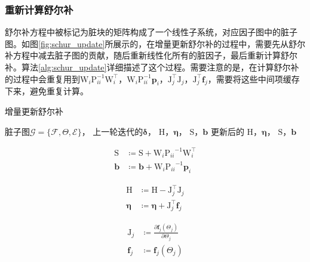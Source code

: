 \subsubsection{重新计算舒尔补}

舒尔补方程中被标记为脏块的矩阵构成了一个线性子系统，对应因子图中的脏子图。如图\ref{fig:schur_update}所展示的，在增量更新舒尔补的过程中，需要先从舒尔补方程中减去脏子图的贡献，随后重新线性化所有的脏因子，最后重新计算舒尔补。算法\ref{alg:schur_update}详细描述了这个过程。需要注意的是，在计算舒尔补的过程中会重复用到$\mathrm{W}_i\mathrm{P}_{ii}^{-1}\mathrm{W}_i^\top$，$\mathrm{W}_i\mathrm{P}_{ii}^{-1}\bm{p}_i$，$\mathrm{J}_j^\top\mathrm{J}_j$，$\mathrm{J}_j^\top\bm{f}_j$，需要将这些中间项缓存下来，避免重复计算。

\begin{algorithm}
\caption{增量更新舒尔补}
\begin{algorithmic}
    \Require 脏子图$\mathcal{G}=\{\mathcal{F},\Theta,\mathcal{E}\}$，
             上一轮迭代的$\bm{\delta}$，
             $\mathrm{H}$，$\bm{\eta}$，
             $\mathrm{S}$，$\bm{b}$
    \Ensure 更新后的
            $\mathrm{H}$，$\bm{\eta}$，
            $\mathrm{S}$，$\bm{b}$

        \[\begin{aligned}
                \mathrm{S} &\coloneqq \mathrm{S} + \mathrm{W}_i{\mathrm{P}_{ii}}^{-1}\mathrm{W}_i^\top \\
                \bm{b}     &\coloneqq \bm{b}     + \mathrm{W}_i{\mathrm{P}_{ii}}^{-1}\bm{p}_i
        \end{aligned}\]
    \EndFor

        \[\begin{aligned}
                \mathrm{H} &\coloneqq \mathrm{H} - \mathrm{J}_j^\top \mathrm{J}_j \\
                \bm{\eta}  &\coloneqq \bm{\eta} + \mathrm{J}_j^\top \bm{f}_j
        \end{aligned}\]

        \[\begin{aligned}
                \mathrm{J}_j &\coloneqq \frac{\partial{\bm{f}_j(\Theta_j)}}
                                             {\partial{\Theta_j}} \\
                \bm{f}_j     &\coloneqq \bm{f}_j(\Theta_j)
        \end{aligned}\]


\end{algorithmic}
\end{algorithm}
